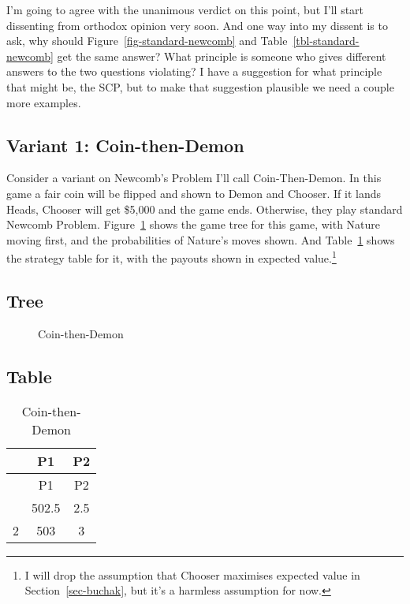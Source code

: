 \documentclass[
  10pt,
  letterpaper,
  DIV=11,
  numbers=noendperiod,
  twoside]{scrartcl}
\begin{document}
I'm going to agree with the unanimous verdict on this point, but I'll
start dissenting from orthodox opinion very soon. And one way into my
dissent is to ask, why should Figure~\ref{fig-standard-newcomb} and
Table~\ref{tbl-standard-newcomb} get the same answer? What principle is
someone who gives different answers to the two questions violating? I
have a suggestion for what principle that might be, the SCP, but to make
that suggestion plausible we need a couple more examples.

\subsection{Variant 1: Coin-then-Demon}\label{variant-1-coin-then-demon}

Consider a variant on Newcomb's Problem I'll call Coin-Then-Demon. In
this game a fair coin will be flipped and shown to Demon and Chooser. If
it lands Heads, Chooser will get \$5,000 and the game ends. Otherwise,
they play standard Newcomb Problem. Figure~\ref{fig-coin-then-demon}
shows the game tree for this game, with Nature moving first, and the
probabilities of Nature's moves shown. And
Table~\ref{tbl-coin-then-demon} shows the strategy table for it, with
the payouts shown in expected value.\footnote{I will drop the assumption
  that Chooser maximises expected value in Section~\ref{sec-buchak}, but
  it's a harmless assumption for now.}

\subsection{Tree}

\begin{figure}


\caption{\label{fig-coin-then-demon}Coin-then-Demon}

\end{figure}%

\subsection{Table}

\begin{longtable}[]{@{}ccc@{}}
\caption{Coin-then-Demon}\label{tbl-coin-then-demon}\tabularnewline
\toprule\noalign{}
& P1 & P2 \\
\midrule\noalign{}
\endfirsthead
\toprule\noalign{}
& P1 & P2 \\
\midrule\noalign{}
\endhead
\bottomrule\noalign{}
\endlastfoot
1 & 502.5 & 2.5 \\
2 & 503 & 3 \\
\end{longtable}
\end{document}
